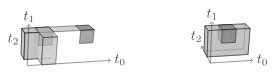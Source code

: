 \documentclass[orivec]{llncs} \usepackage[T1]{fontenc}
\begin{document}
\begin{example}
\[\begin{tikzpicture}[line join=round,opacity=0.7]
\draw(1.052,-.61)--(1.395,-.589);
\draw(1.437,.072)--(1.084,.055);
\filldraw[fill=gray](1.068,-.283)--(1.416,-.263)--(1.437,.072)--(1.084,.055)--cycle;
\filldraw[fill=lightgray](1.147,-.763)--(1.183,-.076)--(.993,.175)--(.964,-.468)--cycle;
\filldraw[fill=lightgray](.705,-.631)--(.727,.037)--(.649,.158)--(.63,-.487)--cycle;
\filldraw[fill=lightgray](.705,-.631)--(.727,.037)--(.649,.158)--(.63,-.487)--cycle;
\filldraw[fill=gray](1.068,-.283)--(1.084,.055)--(.993,.175)--(.978,-.151)--cycle;
\filldraw[fill=lightgray](.727,.037)--(2.473,.125)--(2.331,.24)--(.649,.158)--cycle;
\filldraw[fill=gray](2.132,.107)--(2.473,.125)--(2.331,.24)--(2.002,.224)--cycle;
\filldraw[fill=lightgray](.727,.037)--(1.437,.072)--(1.333,.192)--(.649,.158)--cycle;
\filldraw[fill=gray](1.084,.055)--(1.437,.072)--(1.333,.192)--(.993,.175)--cycle;
\filldraw[fill=lightgray](1.183,-.076)--(1.55,-.057)--(1.333,.192)--(.993,.175)--cycle;
\filldraw[fill=gray](2.1,-.225)--(2.436,-.206)--(2.473,.125)--(2.132,.107)--cycle;
\filldraw[fill=lightgray,draw=none](.705,-.631)--(1.052,-.61)--(1.084,.055)--(.727,.037)--cycle;
\draw(1.084,.055)--(.727,.037)--(.705,-.631)--(1.052,-.61);
\filldraw[fill=lightgray,draw=none](.705,-.631)--(1.052,-.61)--(1.084,.055)--(.727,.037)--cycle;
\draw(1.084,.055)--(.727,.037)--(.705,-.631)--(1.052,-.61);
\draw[arrows=->](.786,-.786)--(2.887,-.652);
\filldraw[fill=lightgray](1.147,-.763)--(1.503,-.741)--(1.55,-.057)--(1.183,-.076)--cycle;
\draw[arrows=->](.786,-.786)--(.825,.267);
\draw (3.123,-.637) node {$t_0$};\draw (.832,.452) node {$t_1$};\draw (.435,-.115) node {$t_2$};\end{tikzpicture}   \qquad\qquad
  \begin{tikzpicture}[line join=round,opacity=0.7]
\draw[arrows=->](.786,-.786)--(.561,-.354);
\filldraw[fill=lightgray](1.734,-.568)--(1.786,.09)--(1.669,.208)--(1.622,-.429)--cycle;
\filldraw[fill=lightgray](.705,-.631)--(1.734,-.568)--(1.622,-.429)--(.63,-.487)--cycle;
\filldraw[fill=lightgray](.63,-.487)--(1.622,-.429)--(1.669,.208)--(.649,.158)--cycle;
\filldraw[fill=lightgray](.705,-.631)--(.727,.037)--(.649,.158)--(.63,-.487)--cycle;
\filldraw[fill=gray](.978,-.151)--(1.314,-.133)--(1.333,.192)--(.993,.175)--cycle;
\filldraw[fill=gray](1.068,-.283)--(1.416,-.263)--(1.314,-.133)--(.978,-.151)--cycle;
\filldraw[fill=gray](1.416,-.263)--(1.437,.072)--(1.333,.192)--(1.314,-.133)--cycle;
\filldraw[fill=gray](1.068,-.283)--(1.084,.055)--(.993,.175)--(.978,-.151)--cycle;
\filldraw[fill=lightgray](.727,.037)--(1.786,.09)--(1.669,.208)--(.649,.158)--cycle;
\filldraw[fill=gray](1.084,.055)--(1.437,.072)--(1.333,.192)--(.993,.175)--cycle;
\filldraw[fill=lightgray](.705,-.631)--(1.734,-.568)--(1.786,.09)--(.727,.037)--cycle;
\filldraw[fill=gray](1.068,-.283)--(1.416,-.263)--(1.437,.072)--(1.084,.055)--cycle;
\draw[arrows=->](.786,-.786)--(1.855,-.718);
\draw[arrows=->](.786,-.786)--(.825,.267);
\draw (2.099,-.703) node {$t_0$};\draw (.832,.452) node {$t_1$};\draw (.435,-.115) node {$t_2$};\end{tikzpicture}   \]
\end{example}
\end{document}
